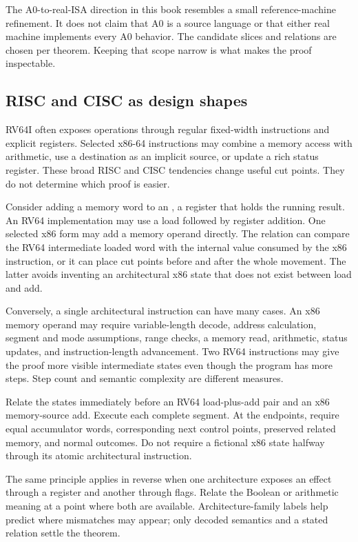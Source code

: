 The A0-to-real-ISA direction in this book resembles a small reference-machine
refinement. It does not claim that A0 is a source language or that either real
machine implements every A0 behavior. The candidate slices and relations are
chosen per theorem. Keeping that scope narrow is what makes the proof
inspectable.

\subsection{RISC and CISC as design shapes}

RV64I often exposes operations through regular fixed-width instructions and
explicit registers. Selected x86-64 instructions may combine a memory access
with arithmetic, use a destination as an implicit source, or update a rich
status register. These broad RISC and CISC tendencies change useful cut points.
They do not determine which proof is easier.

Consider adding a memory word to an , a register that
holds the running result. An RV64 implementation may
use a load followed by register addition. One selected x86 form may add a
memory operand directly. The relation can compare the RV64 intermediate loaded
word with the internal value consumed by the x86 instruction, or it can place
cut points before and after the whole movement. The latter avoids inventing an
architectural x86 state that does not exist between load and add.

Conversely, a single architectural instruction can have many cases. An x86
memory operand may require variable-length decode, address calculation,
segment and mode assumptions, range checks, a memory read, arithmetic, status
updates, and instruction-length advancement. Two RV64 instructions may give
the proof more visible intermediate states even though the program has more
steps. Step count and semantic complexity are different measures.

\begin{example}[title={Choose a relation boundary that both machines possess}]
Relate the states immediately before an RV64 load-plus-add pair and an x86
memory-source add. Execute each complete segment. At the endpoints, require
equal accumulator words, corresponding next control points, preserved related
memory, and normal outcomes. Do not require a fictional x86 state halfway
through its atomic architectural instruction.
\end{example}

The same principle applies in reverse when one architecture exposes an effect
through a register and another through flags. Relate the Boolean or arithmetic
meaning at a point where both are available. Architecture-family labels help
predict where mismatches may appear; only decoded semantics and a stated
relation settle the theorem.

